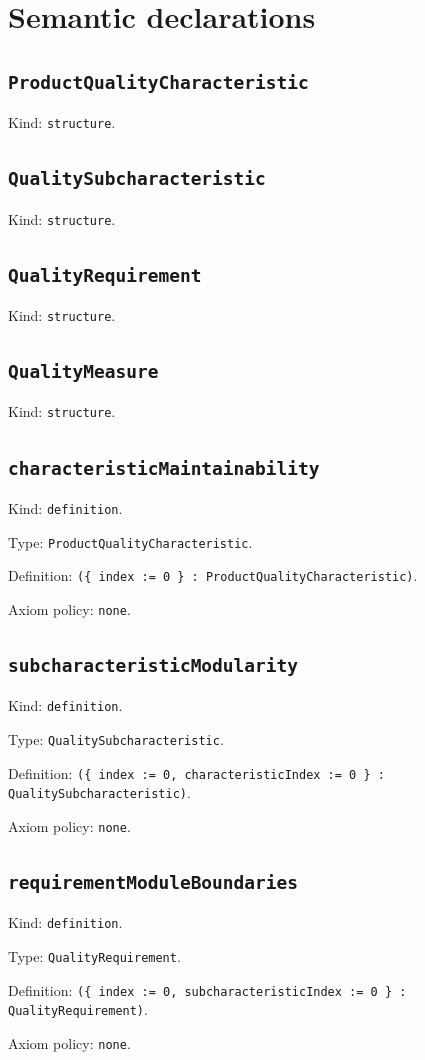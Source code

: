 \documentclass[11pt]{article}
\begin{document}
\section*{Semantic declarations}
\subsection*{\texttt{ProductQualityCharacteristic}}
\noindent Kind: \texttt{structure}.\par
\subsection*{\texttt{QualitySubcharacteristic}}
\noindent Kind: \texttt{structure}.\par
\subsection*{\texttt{QualityRequirement}}
\noindent Kind: \texttt{structure}.\par
\subsection*{\texttt{QualityMeasure}}
\noindent Kind: \texttt{structure}.\par
\subsection*{\texttt{characteristicMaintainability}}
\noindent Kind: \texttt{definition}.\par
\noindent Type: \texttt{ProductQualityCharacteristic}.\par
\noindent Definition: \texttt{(\{ index := 0 \} : ProductQualityCharacteristic)}.\par
\noindent Axiom policy: \texttt{none}.\par
\subsection*{\texttt{subcharacteristicModularity}}
\noindent Kind: \texttt{definition}.\par
\noindent Type: \texttt{QualitySubcharacteristic}.\par
\noindent Definition: \texttt{(\{ index := 0, characteristicIndex := 0 \} : QualitySubcharacteristic)}.\par
\noindent Axiom policy: \texttt{none}.\par
\subsection*{\texttt{requirementModuleBoundaries}}
\noindent Kind: \texttt{definition}.\par
\noindent Type: \texttt{QualityRequirement}.\par
\noindent Definition: \texttt{(\{ index := 0, subcharacteristicIndex := 0 \} : QualityRequirement)}.\par
\noindent Axiom policy: \texttt{none}.\par
\end{document}
